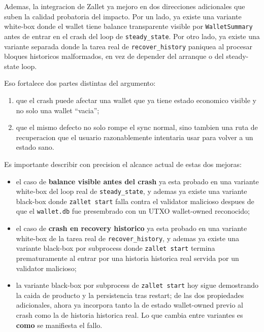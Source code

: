 \documentclass[11pt,a4paper]{article}
\begin{document}
Ademas, la integracion de Zallet ya mejoro en dos direcciones adicionales que
suben la calidad probatoria del impacto. Por un lado, ya existe una variante
white-box donde el wallet tiene balance transparente visible por
\texttt{WalletSummary} antes de entrar en el crash del loop de
\texttt{steady\_state}. Por otro lado, ya existe una variante separada donde
la tarea real de \texttt{recover\_history} paniquea al procesar bloques
historicos malformados, en vez de depender del arranque o del steady-state
loop.

Eso fortalece dos partes distintas del argumento:

\begin{enumerate}[leftmargin=2em]
    \item que el crash puede afectar una wallet que ya tiene estado economico
    visible y no solo una wallet ``vacia'';
    \item que el mismo defecto no solo rompe el sync normal, sino tambien una
    ruta de recuperacion que el usuario razonablemente intentaria usar para
    volver a un estado sano.
\end{enumerate}

Es importante describir con precision el alcance actual de estas dos mejoras:

\begin{itemize}[leftmargin=2em]
    \item el caso de \textbf{balance visible antes del crash} ya esta probado
    en una variante white-box del loop real de \texttt{steady\_state}, y ademas
    ya existe una variante black-box donde \texttt{zallet start} falla contra
    el validator malicioso despues de que el \texttt{wallet.db} fue presembrado
    con un UTXO wallet-owned reconocido;
    \item el caso de \textbf{crash en recovery historico} ya esta probado en
    una variante white-box de la tarea real de \texttt{recover\_history}, y
    ademas ya existe una variante black-box por subprocess donde
    \texttt{zallet start} termina prematuramente al entrar por una historia
    historica real servida por un validator malicioso;
    \item la variante black-box por subprocess de \texttt{zallet start} hoy
    sigue demostrando la caida de producto y la persistencia tras restart;
    de las dos propiedades adicionales, ahora ya incorpora tanto la de estado
    wallet-owned previo al crash como la de historia historica real. Lo que
    cambia entre variantes es \textbf{como} se manifiesta el fallo.
\end{itemize}
\end{document}
